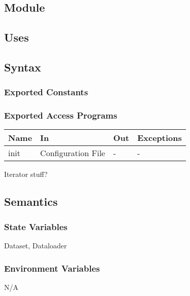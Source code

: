 \documentclass[12pt, titlepage]{article}
\begin{document}
\subsection{Module}



\subsection{Uses}


\subsection{Syntax}



\subsubsection{Exported Constants}



\subsubsection{Exported Access Programs}

\begin{center}
\begin{tabular}{p{2cm} p{4cm} p{4cm} p{2cm}}
\hline
\textbf{Name} & \textbf{In} & \textbf{Out} & \textbf{Exceptions} \\
\hline
init & Configuration File & - & - \\
\hline
\end{tabular}
\end{center}

Iterator stuff?

\subsection{Semantics}

\subsubsection{State Variables}

Dataset,
Dataloader

\subsubsection{Environment Variables}

N/A
\end{document}
